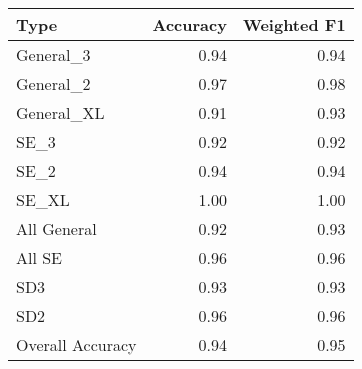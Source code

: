 \begin{tabular}{lrr}
\toprule
Type & Accuracy & Weighted F1 \\
\midrule
General_3 & 0.94 & 0.94 \\
General_2 & 0.97 & 0.98 \\
General_XL & 0.91 & 0.93 \\
SE_3 & 0.92 & 0.92 \\
SE_2 & 0.94 & 0.94 \\
SE_XL & 1.00 & 1.00 \\
All General & 0.92 & 0.93 \\
All SE & 0.96 & 0.96 \\
SD3 & 0.93 & 0.93 \\
SD2 & 0.96 & 0.96 \\
Overall Accuracy & 0.94 & 0.95 \\
\bottomrule
\end{tabular}
